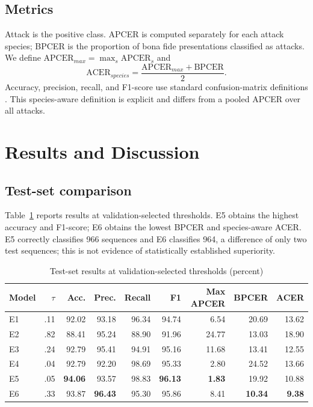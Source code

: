 \documentclass[a4paper,conference]{IEEEtran}
\begin{document}
\subsection{Metrics}
Attack is the positive class. APCER is computed separately for each attack species; BPCER is the proportion of bona fide presentations classified as attacks. We define $\mathrm{APCER}_{max}=\max_s\mathrm{APCER}_s$ and
\begin{equation}
\mathrm{ACER}_{species}=\frac{\mathrm{APCER}_{max}+\mathrm{BPCER}}{2}.
\end{equation}
Accuracy, precision, recall, and F1-score use standard confusion-matrix definitions \cite{sokolova2009}. This species-aware definition is explicit and differs from a pooled APCER over all attacks.

\section{Results and Discussion}
\subsection{Test-set comparison}
Table~\ref{tab:results} reports results at validation-selected thresholds. E5 obtains the highest accuracy and F1-score; E6 obtains the lowest BPCER and species-aware ACER. E5 correctly classifies 966 sequences and E6 classifies 964, a difference of only two test sequences; this is not evidence of statistically established superiority.

\begin{table}[t]
\caption{Test-set results at validation-selected thresholds (percent)}\label{tab:results}\centering\footnotesize
\begin{tabular}{lrrrrrrrr}\toprule
Model & $\tau$ & Acc. & Prec. & Recall & F1 & Max APCER & BPCER & ACER\\\midrule
E1 & .11 & 92.02 & 93.18 & 96.34 & 94.74 & 6.54 & 20.69 & 13.62\\
E2 & .82 & 88.41 & 95.24 & 88.90 & 91.96 & 24.77 & 13.03 & 18.90\\
E3 & .24 & 92.79 & 95.41 & 94.91 & 95.16 & 11.68 & 13.41 & 12.55\\
E4 & .04 & 92.79 & 92.20 & 98.69 & 95.33 & 2.80 & 24.52 & 13.66\\
E5 & .05 & \textbf{94.06} & 93.57 & 98.83 & \textbf{96.13} & \textbf{1.83} & 19.92 & 10.88\\
E6 & .33 & 93.87 & \textbf{96.43} & 95.30 & 95.86 & 8.41 & \textbf{10.34} & \textbf{9.38}\\
\bottomrule\end{tabular}
\end{table}
\end{document}
